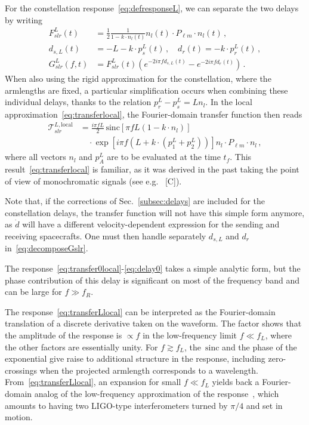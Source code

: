 \documentclass[aps,showpacs,twocolumn,
prd,superscriptaddress,nofootinbib]{revtex4-1}
\newcommand\calT{{\mathcal{T}}}
\newcommand{\nn}{\nonumber}
\newcommand{\hatk}{k}
\newcommand{\sinc}{\,\mathrm{sinc}}
\newcommand{\SM}[1]{{\color{Red} #1}}
\begin{document}
For the constellation response~\eqref{eq:defresponseL}, we can separate the two delays by writing
\begin{align}\label{eq:decomposeGslr}
	F_{slr}^{L}(t) &= \frac{1}{2} \frac{1}{1 - \hatk\cdot n_{l}(t)} n_{l}(t) \cdot P_{\ell m} \cdot n_{l} (t) \,,\nn\\
	d_{s,L}(t) &= -L - k\cdot p_{s}^{L}(t) \,, \quad d_{r}(t) = - k\cdot p_{r}^{L}(t) \,,\nn\\
	G_{slr}^{L}(f,t) &=  F_{slr}^{L}(t) \left( e^{-2i\pi f d_{s,L}(t)} - e^{-2i\pi f d_{r}(t)} \right) \,.
\end{align}
When also using the rigid approximation for the constellation, where the armlengths are fixed, a particular simplification occurs when combining these individual delays, thanks to the relation $p^{L}_{r} - p^{L}_{s} =  L n_{l}$. In the local approximation~\eqref{eq:transferlocal}, the Fourier-domain transfer function then reads
\begin{align}\label{eq:transferLlocal}
	\calT_{slr}^{L, \mathrm{local}} &= \frac{i \pi f L}{2} \sinc \left[ \pi f L\left(1-\hatk\cdot n_{l} \right) \right] \nn\\
	& \quad \cdot \exp\left[ i \pi f \left( L + \hatk\cdot \left( p_{1}^{L} + p_{2}^{L} \right) \right) \right]  n_{l} \cdot P_{\ell m} \cdot n_{l} \,,
\end{align}
where all vectors $n_{l}$ and $p_{A}^{L}$ are to be evaluated at the time $t_{f}$. This result~\eqref{eq:transferlocal} is familiar, as it was derived in the past taking the point of view of monochromatic signals (see e.g.~\cite{} \SM{[C]}).

Note that, if the corrections of Sec.~\ref{subsec:delays} are included for the constellation delays, the transfer function will not have this simple form anymore, as $\dot{d}$ will have a different velocity-dependent expression for the sending and receiving spacecrafts. One must then handle separately $d_{s,L}$ and $d_{r}$ in~\eqref{eq:decomposeGslr}.

The response~\eqref{eq:transfer0local}-\eqref{eq:delay0} takes a simple analytic form, but the phase contribution of this delay is significant on most of the frequency band and can be large for $f \gg f_{R}$.

The response~\eqref{eq:transferLlocal} can be interpreted as the Fourier-domain translation of a discrete derivative taken on the waveform. The factor shows that the amplitude of the response is $\propto f$ in the low-frequency limit $f\ll f_{L}$, where the other factors are essentially unity. For $f\gtrsim f_{L}$, the $\sinc$ and the phase of the exponential give raise to additional structure in the response, including zero-crossings when the projected armlength corresponds to a wavelength. From~\eqref{eq:transferLlocal}, an expansion for small $f\ll f_{L}$ yields back a Fourier-domain analog of the low-frequency approximation of the response~\cite{Cutler97, RCP04}, which amounts to having two LIGO-type interferometers turned by $\pi/4$ and set in motion.
\end{document}
